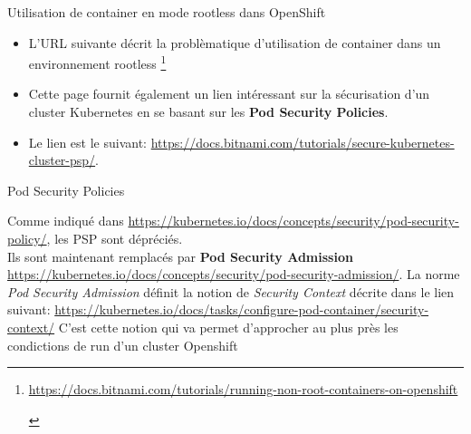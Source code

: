 
\begin{frame}[fragile]{Utilisation de container en mode rootless dans OpenShift}

   \begin{itemize}
      \item L'URL suivante décrit la problèmatique d'utilisation de container dans un environnement rootless \footnote{
\begin{tcolorbox}
   \url{https://docs.bitnami.com/tutorials/running-non-root-containers-on-openshift} \\
\end{tcolorbox}
}
\item Cette page fournit également un lien intéressant sur la sécurisation d'un cluster Kubernetes en se basant sur les \textbf{Pod Security Policies}.\\
\item Le lien est le suivant:
   \url{https://docs.bitnami.com/tutorials/secure-kubernetes-cluster-psp/}.
   \end{itemize}

\end{frame}


\begin{frame}[fragile]{Pod Security Policies}

   Comme indiqué dans \url{https://kubernetes.io/docs/concepts/security/pod-security-policy/}, les PSP sont dépréciés.\\
   Ils sont maintenant remplacés par \textbf{Pod Security Admission} \url{https://kubernetes.io/docs/concepts/security/pod-security-admission/}.
   La norme \textit{Pod Security Admission} définit la notion de \textit{Security Context} décrite dans le lien suivant:
   \url{https://kubernetes.io/docs/tasks/configure-pod-container/security-context/}
   C'est cette notion qui va permet d'approcher au plus près les condictions de run d'un cluster Openshift 

\end{frame}


